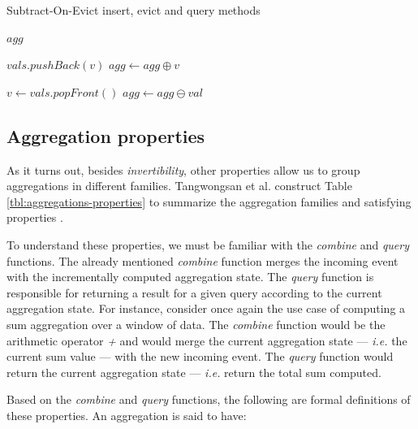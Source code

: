 \begin{algorithm}
    \caption{Subtract-On-Evict insert, evict and query methods}
    \label{pseudo:soe}
    \begin{algorithmic}[1]
        
            \State \Return $agg$
        \EndFunction
        
        
        
            \State $vals.pushBack(v)$
            \State $agg \gets agg \oplus v$
        \EndFunction
        
        
        
            \State $v \gets vals.popFront()$
            \State $agg \gets agg \ominus val$
        \EndFunction
    \end{algorithmic}
\end{algorithm}

\subsection{Aggregation properties}
\label{sec:agg-properties}

As it turns out, besides \textit{invertibility}, other properties allow us to group aggregations in different families. Tangwongsan et al. construct Table \ref{tbl:aggregations-properties} to summarize the aggregation families and satisfying properties \cite{Tangwongsan-Sliding-Window-Aggregation-Algorithms}.

To understand these properties, we must be familiar with the \textit{combine} and \textit{query} functions. The already mentioned \textit{combine} function merges the incoming event with the incrementally computed aggregation state. The \textit{query} function is responsible for returning a result for a given query according to the current aggregation state. For instance, consider once again the use case of computing a sum aggregation over a window of data. The \textit{combine} function would be the arithmetic operator \textit{+} and would merge the current aggregation state --- \textit{i.e.} the current sum value --- with the new incoming event. The \textit{query} function would return the current aggregation state --- \textit{i.e.} return the total sum computed.


Based on the \textit{combine} and \textit{query} functions, the following are formal definitions of these properties. An aggregation is said to have:

